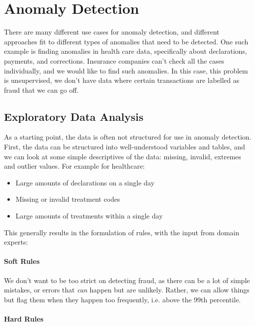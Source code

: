 \section{Anomaly Detection}

There are many different use cases for anomaly detection,
and different approaches fit to different types of anomalies
that need to be detected. One such example is finding anomalies
in health care data, specifically about declarations, payments,
and corrections. Insurance companies can't check all the cases
individually, and we would like to find such anomalies.
In this case, this problem is unsupervised, we don't have data
where certain transactions are labelled as fraud that we can
go off.

\subsection{Exploratory Data Analysis}

As a starting point, the data is often not structured for use
in anomaly detection. First, the data can be structured into
well-understood variables and tables, and we can look at some
simple descriptives of the data: missing, invalid, extremes and
outlier values. For example for healthcare:

\begin{itemize}
  \item Large amounts of declarations on a single day
  \item Missing or invalid treatment codes
  \item Large amounts of treatments within a single day
\end{itemize}

This generally results in the formulation of rules, with the
input from domain experts:

\paragraph{Soft Rules}

We don't want to be too strict on detecting fraud, as there can
be a lot of simple mistakes, or errors that \textit{can} happen
but are unlikely. Rather, we can allow things but flag them when
they happen too frequently, i.e. above the 99th percentile.

\paragraph{Hard Rules}

